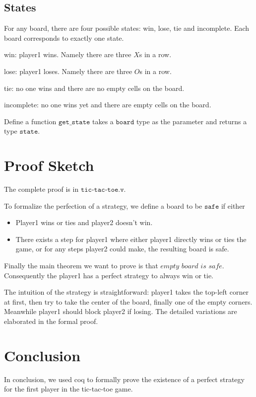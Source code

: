 \documentclass{article}
\begin{document}
\subsection{States}
For any board, there are four possible states: win, lose, tie and incomplete. Each board corresponds to exactly one state. 

	win: player1 wins. Namely there are three $X$s in a row.	
	
	lose: player1 loses. Namely there are three $O$s in a row.
	
	tie: no one wins and there are no empty cells on the board.
	
	incomplete: no one wins yet and there are empty cells on the board.
	
	Define a function $\texttt{get\_state}$ takes a $\texttt{board}$ type as the parameter and returns a type $\texttt{state}$.
	
\section{Proof Sketch}
The complete proof is in $\texttt{tic-tac-toe.v}$.

To formalize the perfection of a strategy, we define a board to be $\texttt{safe}$ if either 
\begin{itemize}
	\item Player1 wins or ties and player2 doesn't win.
	\item There exists a step for player1 where either player1 directly wins or ties the game, or for any steps player2 could make, the resulting board is safe.			
\end{itemize}

Finally the main theorem we want to prove is that $empty$ $board$ $is$ $safe$. Consequently the player1 has a perfect strategy to always win or tie.

The intuition of the strategy is straightforward: player1 takes the top-left corner at first, then try to take the center of the board, finally one of the empty corners. Meanwhile player1 should block player2 if losing. The detailed variations are elaborated in the formal proof.

\section{Conclusion}
In conclusion, we used coq to formally prove the existence of a perfect strategy for the first player in the tic-tac-toe game.
\end{document}

